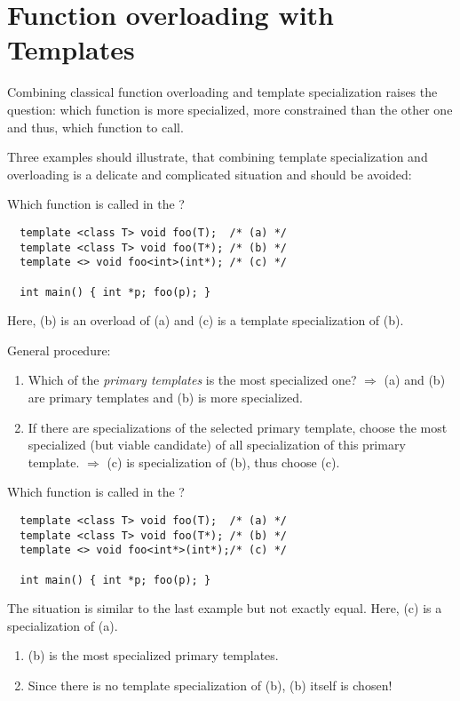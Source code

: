 \section{Function overloading with Templates}
Combining classical function overloading and template specialization raises the question: which function is more specialized, more constrained than the
other one and thus, which function to call.

Three examples should illustrate, that combining template specialization and overloading is a delicate and complicated situation and should be avoided:

\begin{example}
  Which function is called in the ?
  \begin{verbatim}
  template <class T> void foo(T);  /* (a) */
  template <class T> void foo(T*); /* (b) */
  template <> void foo<int>(int*); /* (c) */

  int main() { int *p; foo(p); }
  \end{verbatim}
  Here, (b) is an overload of (a) and (c) is a template specialization of (b).

  General procedure:
  \begin{enumerate}
    \item Which of the \emph{primary templates} is the most specialized one? $\Rightarrow$ (a) and (b) are primary templates and (b) is more specialized.
    \item If there are specializations of the selected primary template, choose the most specialized (but viable candidate) of all specialization of this
          primary template. $\Rightarrow$ (c) is specialization of (b), thus choose (c).
  \end{enumerate}
\end{example}

\begin{example}
  Which function is called in the ?
  \begin{verbatim}
  template <class T> void foo(T);  /* (a) */
  template <class T> void foo(T*); /* (b) */
  template <> void foo<int*>(int*);/* (c) */

  int main() { int *p; foo(p); }
  \end{verbatim}
  The situation is similar to the last example but not exactly equal. Here, (c) is a specialization of (a).

  \begin{enumerate}
    \item (b) is the most specialized primary templates.
    \item Since there is no template specialization of (b), (b) itself is chosen!
  \end{enumerate}
\end{example}

